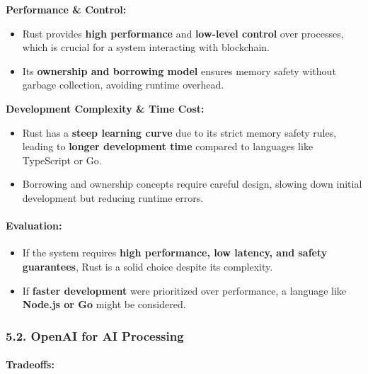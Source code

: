 \documentclass[
]{article}
\providecommand{\tightlist}{%
  \setlength{\itemsep}{0pt}\setlength{\parskip}{0pt}}
\begin{document}
\textbf{Performance \& Control:}

\begin{itemize}
\tightlist
\item
  Rust provides \textbf{high performance} and \textbf{low-level control}
  over processes, which is crucial for a system interacting with
  blockchain.
\item
  Its \textbf{ownership and borrowing model} ensures memory safety
  without garbage collection, avoiding runtime overhead.
\end{itemize}

\textbf{Development Complexity \& Time Cost:}

\begin{itemize}
\tightlist
\item
  Rust has a \textbf{steep learning curve} due to its strict memory
  safety rules, leading to \textbf{longer development time} compared to
  languages like TypeScript or Go.
\item
  Borrowing and ownership concepts require careful design, slowing down
  initial development but reducing runtime errors.
\end{itemize}

\hypertarget{evaluation}{%
\paragraph{\texorpdfstring{\textbf{Evaluation:}}{Evaluation:}}\label{evaluation}}

\begin{itemize}
\tightlist
\item
  If the system requires \textbf{high performance, low latency, and
  safety guarantees}, Rust is a solid choice despite its complexity.
\item
  If \textbf{faster development} were prioritized over performance, a
  language like \textbf{Node.js or Go} might be considered.
\end{itemize}

\hypertarget{openai-for-ai-processing-1}{%
\subsubsection{\texorpdfstring{\textbf{5.2. OpenAI for AI
Processing}}{5.2. OpenAI for AI Processing}}\label{openai-for-ai-processing-1}}

\hypertarget{tradeoffs-1}{%
\paragraph{\texorpdfstring{\textbf{Tradeoffs:}}{Tradeoffs:}}\label{tradeoffs-1}}
\end{document}
